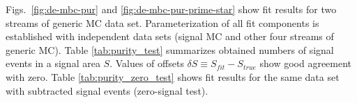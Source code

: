 \documentclass[preprint,aps,showpacs]{revtex4}
\begin{document}
Figs.~\ref{fig:de-mbc-pur} and \ref{fig:de-mbc-pur-prime-star} show fit results for two streams of generic MC data set. Parameterization of all fit components is established with independent data sets (signal MC and other four streams of generic MC). Table \ref{tab:purity_test} summarizes obtained numbers of signal events in a signal area $S$. Values of offsets $\delta S \equiv S_{fit}-S_{true}$ show good agreement with zero.
Table \ref{tab:purity_zero_test} shows fit results for the same data set with subtracted signal events (zero-signal test).
\end{document}
